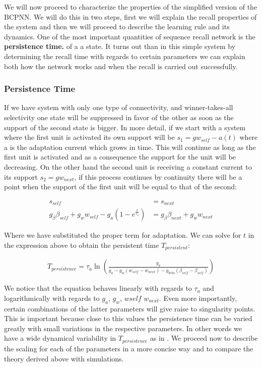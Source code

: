 \documentclass[10pt,a4paper]{article}
\begin{document}
We will now proceed to characterize the properties of the simplified version of the BCPNN. We will do this in two steps, first we will explain the recall properties of the system and then we will proceed to describe the learning rule and its dynamics. One of the most important quantities of sequence recall network is the \textbf{persistence time.} of a a state. It turns out than in this simple system by determining the recall time with regards to certain parameters we can explain both how the network works and when the recall is carried out successfully.


\subsubsection{Persistence Time}
If we have system with only one type of connectivity, and winner-takes-all selectivity one state will be suppressed in favor of the other as soon as the support of the second state is bigger. In more detail, if we start with a system where the first unit is activated its own support will be $s_1 = g w_{self} - a(t)$ where a is the adaptation current which grows in time. This will continue as long as the first unit is activated and as a consequence the support for the unit will be decreasing. On the other hand the second unit is receiving a constant current to its support $s_2 = g w_{next}$, if this process continues by continuity there will be a point when the support of the first unit will be equal to that of the second:

\begin{align*}
s_{self} &= s_{next} \\
g_{\beta} \beta_{self} + g_w w_{self} - g_{a} (1 - e^{\frac{t}{\tau_a}}) &= g_{\beta} \beta_{next} + g_w w_{next}
\end{align*}

Where we have substituted the proper term for adaptation. We can solve for $t$ in the expression above to obtain the persistent time $T_{persistent}$:

\begin{align}
T_{persistence} = \tau_{a} \ln \left(\frac{g_a}{g_a - g_w (w_{self}  - w_{next}) - g_{beta} (\beta_{self} - \beta_{self})} \right) \label{eq:simple_bcpnn_persistence_time}
\end{align}

We notice that the equation behaves linearly with regards to $\tau_a$ and logarithmically with regards to $g_a$, $g_w$, $w{self}$ $w_{next}$. Even more importantly, certain combinations of the latter parameters will give raise to singularity points. This is important because close to this values the persistence time can be varied greatly with small variations in the respective parameters. In other words we have a wide dynamical variability in $T_{persistence}$ as in \cite{murray2017learning}. We proceed now to describe the scaling for each of the parameters in a more concise way and to compare the theory derived above with simulations. 
\end{document}

